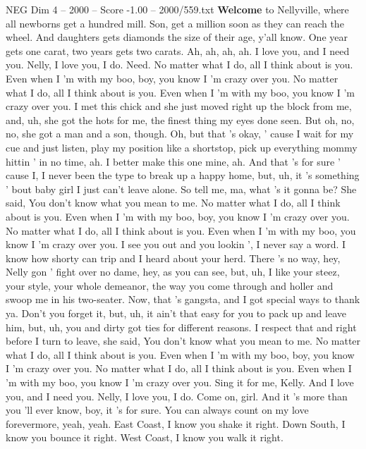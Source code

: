 \begin{textsample}{NEG Dim 4 – 2000 – Score -1.00 – 2000/559.txt}  \label{ex:f4_neg_037}
\textbf{Welcome} to Nellyville, where all newborns get a hundred mill.
Son, get a million soon as they can reach the wheel.
And daughters gets diamonds the size of their age, y'all know.
One year gets one carat, two years gets two carats.
Ah, ah, ah, ah.
I love you, and I need you.
Nelly, I love you, I do.
Need.
No matter what I do, all I think about is you.
Even when I 'm with my boo, boy, you know I 'm crazy over you.
No matter what I do, all I think about is you.
Even when I 'm with my boo, you know I 'm crazy over you.
I met this chick and she just moved right up the block from me, and, uh, she got the hots for me, the finest thing my eyes done seen.
But oh, no, no, she got a man and a son, though.
Oh, but that 's okay, ' cause I wait for my cue and just listen, play my position like a shortstop, pick up everything mommy hittin ' in no time, ah.
I better make this one mine, ah.
And that 's for sure ' cause I, I never been the type to break up a happy home, but, uh, it 's something ' bout baby girl I just can't leave alone.
So tell me, ma, what 's it gonna be?
She said, You don't know what you mean to me.
No matter what I do, all I think about is you.
Even when I 'm with my boo, boy, you know I 'm crazy over you.
No matter what I do, all I think about is you.
Even when I 'm with my boo, you know I 'm crazy over you.
I see you out and you lookin ', I never say a word.
I know how shorty can trip and I heard about your herd.
There 's no way, hey, Nelly gon ' fight over no dame, hey, as you can see, but, uh, I like your steez, your style, your whole demeanor, the way you come through and holler and swoop me in his two-seater.
Now, that 's gangsta, and I got special ways to thank ya.
Don't you forget it, but, uh, it ain't that easy for you to pack up and leave him, but, uh, you and dirty got ties for different reasons.
I respect that and right before I turn to leave, she said, You don't know what you mean to me.
No matter what I do, all I think about is you.
Even when I 'm with my boo, boy, you know I 'm crazy over you.
No matter what I do, all I think about is you.
Even when I 'm with my boo, you know I 'm crazy over you.
Sing it for me, Kelly.
And I love you, and I need you.
Nelly, I love you, I do.
Come on, girl.
And it 's more than you 'll ever know, boy, it 's for sure.
You can always count on my love forevermore, yeah, yeah.
East Coast, I know you shake it right.
Down South, I know you bounce it right.
West Coast, I know you walk it right.

\end{textsample}

